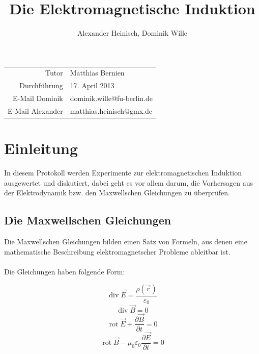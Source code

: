 \documentclass{article}
\title{Die Elektromagnetische Induktion}
\author{Alexander Heinisch, Dominik Wille}
\begin{document}
\maketitle
\vspace{13cm}
\noindent
\begin{center}
\begin{tabular}{r l}
Tutor & Matthias Bernien  \\
Durchführung & 17. April 2013 \\

E-Mail Dominik & dominik.wille@fu-berlin.de \\
E-Mail Alexander & matthias.heinisch@gmx.de \\
\end{tabular}
\end{center}

\newpage
\tableofcontents
\newpage

\section{Einleitung}

In diesem Protokoll werden Experimente zur elektromagnetischen Induktion ausgewertet und diskutiert, dabei geht es vor allem darum, die Vorhersagen aus der Elektrodynamik bzw. den {\sc Maxwellschen Gleichungen} zu überprüfen.
 
\subsection{Die Maxwellschen Gleichungen}

Die Maxwellschen Gleichungen bilden einen Satz von Formeln, aus denen eine mathematische Beschreibung elektromagnetscher Probleme ableitbar ist.\\ \\
Die Gleichungen haben folgende Form:

\begin{equation}\label{maxwell1}
\operatorname{div} \vec{E} = \frac{\rho(\vec{r})}{\varepsilon_0}
\end{equation}
\begin{equation}\label{maxwell2}
\operatorname{div} \vec{B} = 0
\end{equation}
\begin{equation}\label{maxwell3}
\operatorname{rot} \vec{E} + \frac{\partial \vec{B}}{\partial t}= 0
\end{equation}
\begin{equation}\label{maxwell4}
\operatorname{rot} \vec{B} - \mu_0 \varepsilon_0 \frac{\partial \vec{E}}{\partial t} = 0
\end{equation}
\end{document}
